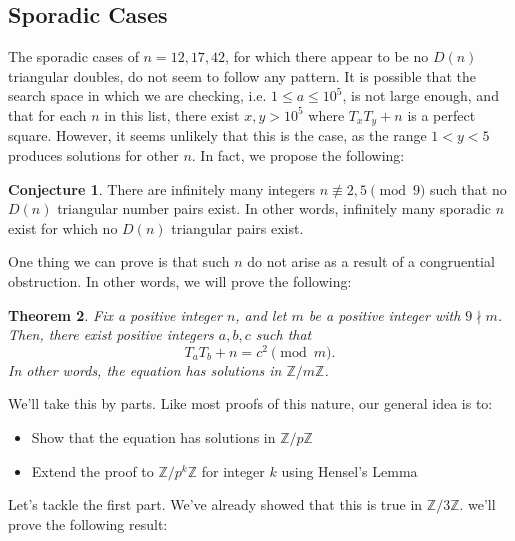 \documentclass[12pt]{amsart}
\theoremstyle{theorem}
\newtheorem{theorem}{Theorem}
\theoremstyle{definition}
\newtheorem{conjecture}[theorem]{Conjecture}%
\theoremstyle{plain}
\begin{document}
\subsection{Sporadic Cases}
The sporadic cases of $n = 12, 17, 42$, for which there appear to be no $D(n)$ triangular doubles, do not seem to follow any pattern. It is possible that the search space in which we are checking, i.e. $1 \le a \le 10^5$, is not large enough, and that for each $n$ in this list, there exist $x, y > 10^5$ where $T_x T_y + n$ is a perfect square. However, it seems unlikely that this is the case, as the range $1 < y < 5$ produces solutions for other $n$. In fact, we propose the following:

\begin{conjecture}\label{conj}
    There are infinitely many integers $n \not\equiv 2, 5 \pmod{9}$ such that no $D(n)$ triangular number pairs exist. In other words, infinitely many sporadic $n$ exist for which no $D(n)$ triangular pairs exist.
\end{conjecture}

One thing we can prove is that such $n$ do not arise as a result of a congruential obstruction. In other words, we will prove the following:

\begin{theorem}\label{big theorem n}
Fix a positive integer $n$, and let $m$ be a positive integer with $9 \nmid m$. Then, there exist positive integers $a,b,c$ such that $$T_a T_b + n = c^2 \pmod{m}.$$ In other words, the equation has solutions in $\mathbb{Z}/m \mathbb{Z}$. \end{theorem}

We'll take this by parts. Like most proofs of this nature, our general idea is to:

\begin{itemize}
    \item Show that the equation has solutions in $\mathbb{Z}/p\mathbb{Z}$
    \item Extend the proof to $\mathbb{Z}/p^k\mathbb{Z}$ for integer $k$ using Hensel's Lemma
\end{itemize}


Let's tackle the first part. We've already showed that this is true in $\mathbb{Z} / 3 \mathbb{Z}$. we'll prove the following result:
\end{document}
